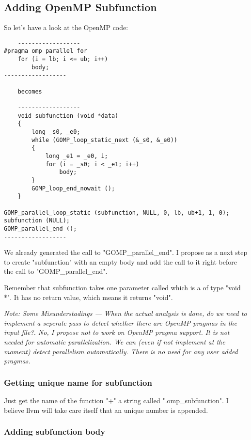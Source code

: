 \documentclass[a4paper,10pt]{article}
\begin{document}
\subsection{Adding OpenMP Subfunction}

So let's have a look at the OpenMP code:


\begin{verbatim}    
    ------------------
#pragma omp parallel for
    for (i = lb; i <= ub; i++)
        body;
------------------

    becomes

    ------------------
    void subfunction (void *data)
    {
        long _s0, _e0;
        while (GOMP_loop_static_next (&_s0, &_e0))
        {
            long _e1 = _e0, i;
            for (i = _s0; i < _e1; i++)
                body;
        }
        GOMP_loop_end_nowait ();
    }

GOMP_parallel_loop_static (subfunction, NULL, 0, lb, ub+1, 1, 0);
subfunction (NULL);
GOMP_parallel_end ();
------------------
\end{verbatim}

We already generated the call to "GOMP\_parallel\_end". I propose as a next step to create "subfunction" with an empty body and add the call to it right before the call to "GOMP\_parallel\_end".

Remember that subfunction takes one parameter called which is a of type "void *". It has no return value, which means it returns "void".

\emph{Note: Some Misunderstadings --- When the actual analysis is done, do we need to implement a seperate pass to detect whether there are OpenMP pragmas in the input file?. No, I propose not to work on OpenMP pragma support. It is not needed for automatic parallelization. We can (even if not implement at the moment) detect parallelism automatically. There is no need for any user added pragmas.}

\subsubsection{Getting unique name for subfunction}

Just get the name of the function "+" a string called ".omp\_subfunction". I believe llvm will take care itself that an unique number is appended.

\subsubsection{Adding subfunction body}
\end{document}
